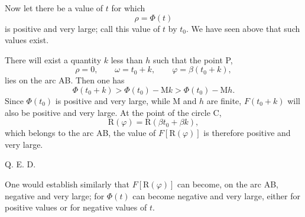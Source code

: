\documentclass[11pt]{article}
\begin{document}
Now let there be a value of $t$ for which
\[
\rho=\Phi(t)
\]
is positive and very large; call this value of $t$ by $t_0$. We have seen above that such values exist.

There will exist a quantity $k$ less than $h$ such that the point P,
\[
\rho=0,
\qquad
\omega=t_0+k,
\qquad
\varphi=\beta(t_0+k),
\]
lies on the arc AB. Then one has
\[
\Phi(t_0+k)>\Phi(t_0)-\mathrm{M}k>\Phi(t_0)-\mathrm{M}h.
\]
Since $\Phi(t_0)$ is positive and very large, while M and $h$ are finite, $F(t_0+k)$ will also be positive and very large. At the point of the circle C,
\[
\mathrm{R}(\varphi)=\mathrm{R}(\beta t_0+\beta k),
\]
which belongs to the arc AB, the value of $F[\mathrm{R}(\varphi)]$ is therefore positive and very large.
\begin{flushright}Q. E. D.\end{flushright}

One would establish similarly that $F[\mathrm{R}(\varphi)]$ can become, on the arc AB, negative and very large; for $\Phi(t)$ can become negative and very large, either for positive values or for negative values of $t$.
\end{document}
